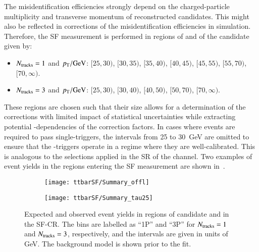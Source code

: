 The \jettotauhadvis misidentification efficiencies strongly depend on the
charged-particle multiplicity and transverse momentum of reconstructed
\tauhadvis candidates. This might also be reflected in corrections of the
\jettotauhadvis misidentification efficiencies in simulation. Therefore, the SF
measurement is performed in regions of \Ntracks and \pT of the \tauhadvis
candidate given by:
\begin{itemize}

\item $\Ntracks = 1$ and $\pT / \si{\GeV}$: $[25, 30)$, $[30, 35)$, $[35, 40)$,
  $[40, 45)$, $[45, 55)$, $[55, 70)$, $[70, \infty)$.

\item $\Ntracks = 3$ and $\pT / \si{\GeV}$: $[25, 30)$, $[30, 40)$, $[40, 50)$,
  $[50, 70)$, $[70, \infty)$.

\end{itemize}
These regions are chosen such that their size allows for a determination of the
corrections with limited impact of statistical uncertainties while extracting
potential \pT-dependencies of the correction factors. In cases where events are
required to pass single-\tauhadvis triggers, the \pT intervals from 25 to
\SI{30}{\GeV} are omitted to ensure that the \tauhadvis-triggers operate in a
regime where they are well-calibrated. This is analogous to the selections
applied in the SR of the \hadhad channel. Two examples of event yields in the
regions entering the SF measurement are shown
in~.

\begin{figure}[htbp]
  \centering

  \begin{subfigure}[t]{.48\textwidth}
    \texttt{[image: ttbarSF/Summary\_offl]}

  \end{subfigure}\hfill%
  \begin{subfigure}[t]{.48\textwidth}
    \texttt{[image: ttbarSF/Summary\_tau25]}

  \end{subfigure}

  \caption[Expected and observed event yields in regions of \tauhadvis candidate
  \Ntracks and \pT in the SF-CR.]{Expected and observed event yields in regions
    of \tauhadvis candidate \Ntracks and \pT in the SF-CR. The bins are labelled
    as ``1P'' and ``3P'' for $\Ntracks = 1$ and $\Ntracks = 3$, respectively,
    and the \pT intervals are given in units of \si{\GeV}. The background model
    is shown prior to the fit.}%
  \label{fig:ttbarsf_region_summary_prefit}
\end{figure}

